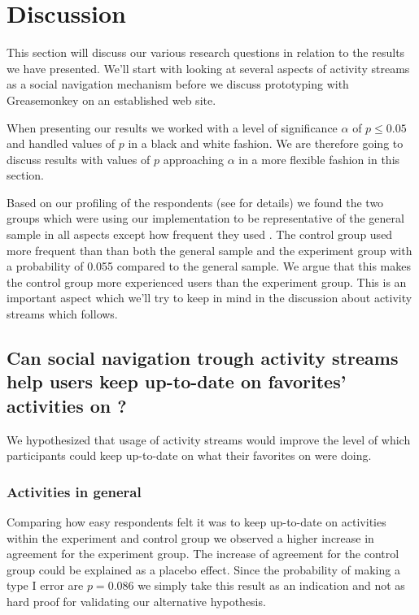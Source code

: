 \section{Discussion}

This section will discuss our various research questions in relation
to the results we have presented. We'll start with looking at
several aspects of activity streams as a social navigation
mechanism before we discuss prototyping with Greasemonkey on
an established web site.

When presenting our results we worked with a level of significance
$\alpha$ of $p \leq 0.05$%
and handled values of $p$ in a black and white fashion.
We are therefore going to discuss results with values of $p$ approaching
$\alpha$ in a more flexible fashion in this section.

Based on our profiling of the respondents (see 
 for details)
we found the two groups which were using our implementation to be
representative of the general sample in all aspects except how
frequent they used \urort{}. The control group used \urort{} more
frequent than than both the general sample and the experiment group
with a probability of 0.055 compared to the general sample.
We argue that this makes the control group more experienced
\urort{} users than the experiment group.
This is an important aspect which we'll try to keep in mind in
the discussion about activity streams which follows.

\subsection{%
  Can social navigation trough activity streams help users keep
  up-to-date on favorites' activities on \urort{}?
}

We hypothesized that usage of activity streams would improve the level
of which participants could keep up-to-date on what their favorites
on \urort{} were doing.

\subsubsection{Activities in general}

Comparing how easy respondents felt it was to keep up-to-date on activities
within the experiment and control group%
we observed a higher increase in agreement for the experiment group. The
increase of agreement for the control group could be explained as
a placebo effect.
Since the probability of making a type I error are
$p = 0.086$ we simply take this result as an indication and not as hard proof
for validating our alternative hypothesis.

